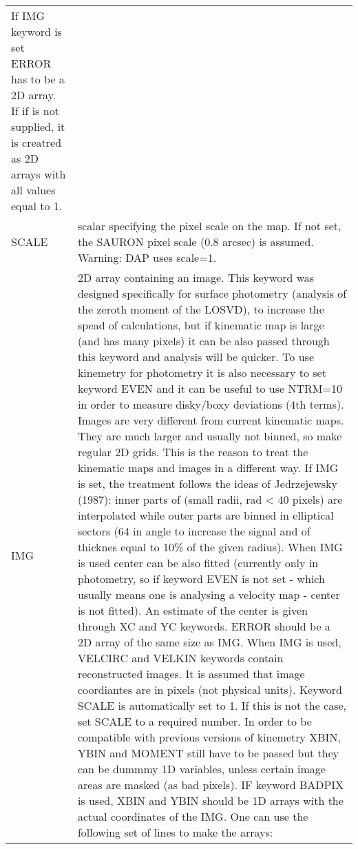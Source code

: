 \begin{center}
\begin{longtable}{p{2.7cm}| p{11.1cm}}
              If IMG keyword is set ERROR has to be a 2D array. If if
              is not supplied, it is creatred as 2D arrays with all
              values equal to 1. \\  
%
SCALE  & scalar specifying the pixel scale on the map. If not set, the
         SAURON pixel scale (0.8 arcsec) is assumed. Warning: DAP uses scale=1.\\
%
IMG    & 2D array containing an image. This keyword was designed specifically
	           for surface photometry (analysis of the zeroth moment of the LOSVD), 
	           to increase the spead of calculations, but if kinematic map is large 
	           (and has many pixels) it can be also passed through this keyword and 
	           analysis will be quicker. To use kinemetry for photometry it is also 
	           necessary to set keyword EVEN and it can be useful to use NTRM=10
 	         in order to measure disky/boxy deviations (4th terms). 
	           Images are very different from current kinematic maps. They are much larger
            and usually not binned, so make regular 2D grids. This is the reason to
	           treat the kinematic maps and images in a different way. If IMG is set,
	           the treatment follows the ideas of Jedrzejewsky (1987): inner parts of
	           (small radii, rad < 40 pixels) are interpolated while outer parts are 
            binned in elliptical sectors (64 in angle to increase the signal and of 
            thicknes equal to 10\% of the given radius). When IMG is used center can 
            be also fitted (currently only in photometry, so if keyword EVEN is not 
            set - which usually means one is analysing a velocity map - center is not fitted). 
            An estimate of the center is given through XC and YC keywords. ERROR should be a 2D array
            of the same size as IMG. When IMG is used, VELCIRC and VELKIN keywords contain 
            reconstructed images. It is assumed that image coordiantes are in pixels 
            (not physical units). Keyword SCALE is automatically set to 1. If this is not 
            the case, set SCALE to a required number. In order to be compatible with 
            previous versions of kinemetry XBIN, YBIN and MOMENT still have to be passed
            but they can be dummmy 1D variables, unless certain image areas are masked 
            (as bad pixels). IF keyword BADPIX is used, XBIN and YBIN should be 1D arrays 
            with the actual coordinates of the IMG. One can use the following set of lines 
            to make the arrays: 


\end{longtable}
\end{center}
